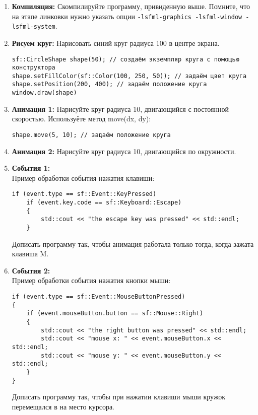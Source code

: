 \documentclass{article}
\begin{document}
\begin{enumerate}
\item \textbf{Компиляция:} Скомпилируйте программу, привиденную выше. Помните, что на этапе линковки нужно указать опции \texttt{-lsfml-graphics -lsfml-window -lsfml-system}.
\item \textbf{Рисуем круг:} Нарисовать синий круг радиуса 100 в центре экрана.
\begin{lstlisting}
sf::CircleShape shape(50); // создаём экземпляр круга с помощью конструктора
shape.setFillColor(sf::Color(100, 250, 50)); // задаём цвет круга
shape.setPosition(200, 400); // задаём положение круга
window.draw(shape)
\end{lstlisting}
\item \textbf{Анимация 1:} Нарисуйте круг радиуса 10, двигающийся с постоянной скоростью. Используёте метод move(dx, dy):
\begin{lstlisting}
shape.move(5, 10); // задаём положение круга
\end{lstlisting}
\item \textbf{Анимация 2:} Нарисуйте круг радиуса 10, двигающийся по окружности.
\item \textbf{События 1:} \\
Пример обработки события нажатия клавиши:
\begin{lstlisting}
if (event.type == sf::Event::KeyPressed)
    if (event.key.code == sf::Keyboard::Escape)
    {
        std::cout << "the escape key was pressed" << std::endl;
    }
\end{lstlisting}
Дописать программу так, чтобы анимация работала только тогда, когда зажата клавиша M.

\item \textbf{События 2:} \\
Пример обработки события нажатия кнопки мыши:
\begin{lstlisting}
if (event.type == sf::Event::MouseButtonPressed)
{
    if (event.mouseButton.button == sf::Mouse::Right)
    {
        std::cout << "the right button was pressed" << std::endl;
        std::cout << "mouse x: " << event.mouseButton.x << std::endl;
        std::cout << "mouse y: " << event.mouseButton.y << std::endl;
    }
}
\end{lstlisting}
Дописать программу так, чтобы при нажатии клавиши мыши кружок перемещался в на место курсора.


\end{enumerate}
\end{document}
